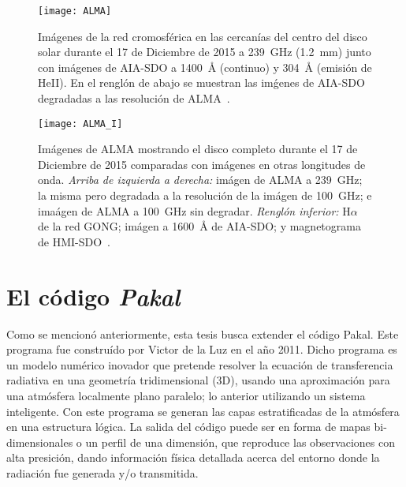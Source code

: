 \begin{figure}[ht]
\centering
\texttt{[image: ALMA]}
\caption{Im\'agenes de la red cromosf\'erica en las cercan\'ias del centro del disco solar durante el 17 de Diciembre de 2015 a 239~GHz (1.2~mm) junto con im\'agenes de AIA-SDO a 1400~$\mbox{\AA}$ (continuo) y 304~$\mbox{\AA}$ (emisi\'on de HeII). En el rengl\'on de abajo se muestran las im\'genes de AIA-SDO degradadas a las resoluci\'on de ALMA~\cite{2017A&A...605A..78A}.}
\label{fig:chromosphericnet1}
\end{figure}

\begin{figure}[ht]
\centering
\texttt{[image: ALMA\_I]}
\caption{Im\'agenes de ALMA mostrando el disco completo durante el 17 de Diciembre de 2015 comparadas con im\'agenes en otras longitudes de onda. \emph{Arriba de izquierda a derecha: }im\'agen de ALMA a 239~GHz; la misma pero degradada a la resoluci\'on de la im\'agen de 100~GHz; e ima\'agen de ALMA a 100~GHz sin degradar. \emph{Rengl\'on inferior: } H$\alpha$ de la red GONG; im\'agen a 1600~$\mbox{\AA}$ de AIA-SDO; y magnetograma de HMI-SDO~\cite{2017A&A...605A..78A}.}
\label{fig:chromosphericnet2}
\end{figure}





\section{El c\'odigo \emph{Pakal}}
Como se mencion\'o anteriormente, esta tesis busca extender el c\'odigo Pakal. Este programa fue constru\'ido por Victor de la Luz en el a\~no 2011\citep{Pakal}. Dicho programa es un modelo num\'erico inovador que pretende resolver la ecuaci\'on de transferencia radiativa en una geometr\'ia tridimensional (3D), usando una aproximaci\'on para una atm\'osfera localmente plano paralelo; lo anterior utilizando un sistema inteligente. Con este programa se generan las capas estratificadas de la atm\'osfera en una estructura l\'ogica. La salida del c\'odigo puede ser en forma de mapas bi-dimensionales o un perfil de una dimensi\'on, que reproduce las observaciones con alta presici\'on, dando informaci\'on f\'isica detallada acerca del entorno donde la radiaci\'on fue generada y/o transmitida.

